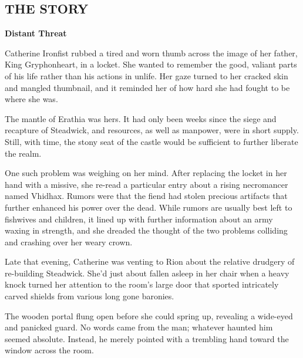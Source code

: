 
\newpage


\begin{multicols*}{2}

\subsection*{\MakeUppercase{The story}}

\textbf{Distant Threat}

Catherine Ironfist rubbed a tired and worn thumb across the image of her father, King Gryphonheart, in a locket. She wanted to remember the good, valiant parts of his life rather than his actions in unlife. Her gaze turned to her cracked skin and mangled thumbnail, and it reminded her of how hard she had fought to be where she was. 

The mantle of Erathia was hers. It had only been weeks since the siege and recapture of Steadwick, and resources, as well as manpower, were in short supply. Still, with time, the stony seat of the castle would be sufficient to further liberate the realm.

One such problem was weighing on her mind. After replacing the locket in her hand with a missive, she re-read a particular entry about a rising necromancer named Vhidhax. Rumors were that the fiend had stolen precious artifacts that further enhanced his power over the dead. While rumors are usually best left to fishwives and children, it lined up with further information about an army waxing in strength, and she dreaded the thought of the two problems colliding and crashing over her weary crown.

Late that evening, Catherine was venting to Rion about the relative drudgery of re-building Steadwick. She'd just about fallen asleep in her chair when a heavy knock turned her attention to the room's large door that sported intricately carved shields from various long gone baronies. 

The wooden portal flung open before she could spring up, revealing a wide-eyed and panicked guard. No words came from the man; whatever haunted him seemed absolute. Instead, he merely pointed with a trembling hand toward the window across the room.


\end{multicols*}

